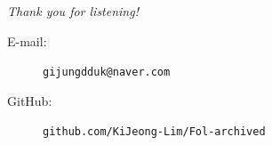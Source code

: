 \documentclass[serif,table,10pt]{beamer}
\newcommand{\0}{\texttt{0}}
\newcommand{\1}{\texttt{1}}
\begin{document}
\begin{frame}
    \begin{center}
        \textit{\huge Thank you for listening!}
    \end{center}
    \begin{center}
        \begin{minipage}{0.77\textwidth}
            \begin{description}
                \item[{E-mail:}] \texttt{gijungdduk@naver.com}
                \item[{GitHub:}] \texttt{github.com/KiJeong-Lim/Fol-archived}
            \end{description}
        \end{minipage}
    \end{center}
\end{frame}
\end{document}
